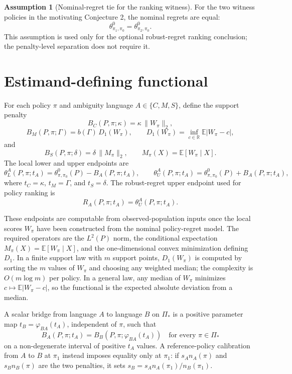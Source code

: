 \documentclass[11pt]{article}
\newcommand{\E}{\mathbb{E}}
\newcommand{\R}{\mathbb{R}}
\theoremstyle{definition}
\newtheorem{assumption}{Assumption}
\theoremstyle{plain}
\theoremstyle{remark}
\begin{document}
\begin{assumption}[Nominal-regret tie for the ranking witness]\label{ass:nominal-tie}
For the two witness policies in the motivating Conjecture 2, the nominal regrets
are equal:
\[
  \theta^0_{\pi_1,\pi_0}=\theta^0_{\pi_2,\pi_0}.
\]
This assumption is used only for the optional robust-regret ranking conclusion;
the penalty-level separation does not require it.
\end{assumption}

\section{Estimand-defining functional}
For each policy $\pi$ and ambiguity language $A\in\{C,M,S\}$, define the support
penalty
\[
  B_C(P,\pi;\kappa)=\kappa\,\|W_\pi\|_2,
\]
\[
  B_M(P,\pi;\Gamma)=b(\Gamma)\,D_1(W_\pi),
  \qquad
  D_1(W_\pi)=\inf_{c\in\R}\E|W_\pi-c|,
\]
and
\[
  B_S(P,\pi;\delta)=\delta\,\|M_\pi\|_2,
  \qquad M_\pi(X)=\E[W_\pi\mid X].
\]
The local lower and upper endpoints are
\[
  \theta^A_L(P,\pi;t_A)=\theta^0_{\pi,\pi_0}(P)-B_A(P,\pi;t_A),
  \qquad
  \theta^A_U(P,\pi;t_A)=\theta^0_{\pi,\pi_0}(P)+B_A(P,\pi;t_A),
\]
where $t_C=\kappa$, $t_M=\Gamma$, and $t_S=\delta$.  The robust-regret upper
endpoint used for policy ranking is
\[
  R_A(P,\pi;t_A)=\theta^A_U(P,\pi;t_A).
\]

These endpoints are computable from observed-population inputs once the local scores
$W_\pi$ have been constructed from the nominal policy-regret model.  The required
operators are the $L^2(P)$ norm, the conditional expectation $M_\pi(X)=\E[W_\pi\mid X]$,
and the one-dimensional convex minimization defining $D_1$.  In a finite support
law with $m$ support points, $D_1(W_\pi)$ is computed by sorting the $m$ values of
$W_\pi$ and choosing any weighted median; the complexity is $O(m\log m)$ per policy.
In a general law, any median of $W_\pi$ minimizes $c\mapsto\E|W_\pi-c|$, so the
functional is the expected absolute deviation from a median.

A scalar bridge from language $A$ to language $B$ on $\Pi_\ast$ is a positive
parameter map $t_B=\varphi_{BA}(t_A)$, independent of $\pi$, such that
\[
  B_A(P,\pi;t_A)=B_B(P,\pi;\varphi_{BA}(t_A))
  \quad\text{for every }\pi\in\Pi_\ast
\]
on a non-degenerate interval of positive $t_A$ values.  A reference-policy
calibration from $A$ to $B$ at $\pi_1$ instead imposes equality only at $\pi_1$:
if $s_A n_A(\pi)$ and $s_B n_B(\pi)$ are the two penalties, it sets
$s_B=s_A n_A(\pi_1)/n_B(\pi_1)$.
\end{document}
